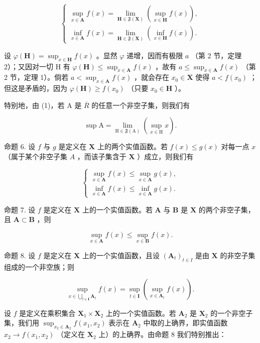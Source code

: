 \[
\left\{ \begin{array}{l} \sup _ {x \in \mathbf {A}} f (x) = \lim _ {\mathbf {H} \in \mathfrak {F} (\mathbf {X})} (\sup _ {x \in \mathbf {H}} f (x)), \\ \inf _ {x \in \mathbf {A}} f (x) = \lim _ {\mathbf {H} \in \mathfrak {F} (\mathbf {X})} (\inf _ {x \in \mathbf {H}} f (x)). \end{array} \right.\tag{3}
\]

设 \(\varphi(\mathbf{H}) = \sup_{x \in \mathbf{H}} f(x)\) 。显然 \(\varphi\) 递增，因而有极限 \(a\) （第 2 节，定理 2）；又因对一切 H 有 \(\varphi(\mathbf{H}) \leqslant \sup_{x \in \mathbf{A}} f(x)\) ，故有 \(a \leqslant \sup_{x \in \mathbf{A}} f(x)\) （第 2 节，定理 1）。倘若 \(a < \sup_{x \in \mathbf{A}} f(x)\) ，就会存在 \(x_0 \in \mathbf{X}\) 使得 \(a < f(x_0)\) ；但这是矛盾的，因为 \(\varphi(\mathbf{H}) \geqslant f(x_0)\) （只要 \(x_0 \in \mathbf{H}\) ）。

特别地，由 (1)，若 A 是 \(\overline{R}\) 的任意一个非空子集，则我们有

\[
\sup \mathrm{A} = \lim _ {\mathrm{H} \in \mathfrak {F} (\mathrm{A})} (\sup _ {x \in \mathrm{H}} x).\tag{4}
\]

命题 6. 设 \(f\) 与 \(g\) 是定义在 \(\mathbf{X}\) 上的两个实值函数。若 \(f(x) \leqslant g(x)\) 对每一点 \(x\) （属于某个非空子集 \(A\) ，而该子集含于 \(\mathbf{X}\) ）成立，则我们有

\[
\left\{ \begin{array}{l} \sup _ {x \in \mathbf {A}} f (x) \leqslant \sup _ {x \in \mathbf {A}} g (x), \\ \inf _ {x \in \mathbf {A}} f (x) \leqslant \inf _ {x \in \mathbf {A}} g (x). \end{array} \right.\tag{5}
\]

命题 7. 设 \(f\) 是定义在 \(\mathbf{X}\) 上的一个实值函数。若 \(\mathbf{A}\) 与 \(\mathbf{B}\) 是 \(\mathbf{X}\) 的两个非空子集，且 \(\mathbf{A} \subset \mathbf{B}\) ，则

\[
\sup _ {x \in \mathbf {A}} f (x) \leqslant \sup _ {x \in \mathbf {B}} f (x).\tag{6}
\]

命题 8. 设 \(f\) 是定义在 \(\mathbf{X}\) 上的一个实值函数，且设 \((\mathbf{A}_t)_{t \in I}\) 是由 \(\mathbf{X}\) 的非空子集组成的一个非空族；则

\[
\sup_{x\in \bigcup_{t\in \mathbf{I}}\mathbf{A}_{t}}f(x) = \sup_{t\in \mathbf{I}}(\sup_{x\in \mathbf{A}_{t}}f(x)).\tag{7}
\]

设 \(f\) 是定义在乘积集合 \(\mathbf{X}_1 \times \mathbf{X}_2\) 上的一个实值函数。若 \(\mathbf{A}_2\) 是 \(\mathbf{X}_2\) 的一个非空子集，我们用 \(\sup_{x_2 \in \mathbf{A}_2} f(x_1, x_2)\) 表示在 \(\mathbf{A}_2\) 中取的上确界，即实值函数 \(x_2 \to f(x_1, x_2)\) （定义在 \(\mathbf{X}_2\) 上）的上确界。由命题 8 我们特别推出：

